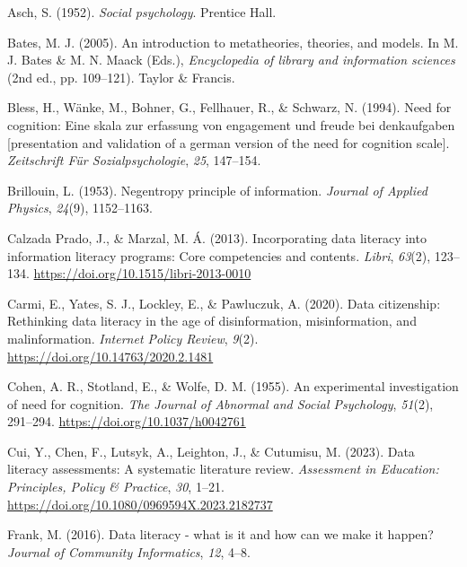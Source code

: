 \documentclass[
  12pt,
  a4paper,
  twoside]{article}
\newlength{\cslhangindent}
\newenvironment{CSLReferences}[2] %
 {\begin{list}{}{%
  \setlength{\itemindent}{0pt}
  \setlength{\leftmargin}{0pt}
  \setlength{\parsep}{0pt}
  \ifodd #1
   \setlength{\leftmargin}{\cslhangindent}
   \setlength{\itemindent}{-1\cslhangindent}
  \fi
  \setlength{\itemsep}{#2\baselineskip}}}
 {\end{list}}
\begin{document}
\label{refs}
\begin{CSLReferences}{1}{0}
Asch, S. (1952). \emph{Social psychology}. Prentice Hall.

Bates, M. J. (2005). An introduction to metatheories, theories, and models. In M. J. Bates \& M. N. Maack (Eds.), \emph{Encyclopedia of library and information sciences} (2nd ed., pp. 109--121). Taylor \& Francis.

Bless, H., Wänke, M., Bohner, G., Fellhauer, R., \& Schwarz, N. (1994). Need for cognition: Eine skala zur erfassung von engagement und freude bei denkaufgaben {[}presentation and validation of a german version of the need for cognition scale{]}. \emph{Zeitschrift Für Sozialpsychologie}, \emph{25}, 147--154.

Brillouin, L. (1953). Negentropy principle of information. \emph{Journal of Applied Physics}, \emph{24}(9), 1152--1163.

Calzada Prado, J., \& Marzal, M. Á. (2013). Incorporating data literacy into information literacy programs: Core competencies and contents. \emph{Libri}, \emph{63}(2), 123--134. \url{https://doi.org/10.1515/libri-2013-0010}

Carmi, E., Yates, S. J., Lockley, E., \& Pawluczuk, A. (2020). Data citizenship: Rethinking data literacy in the age of disinformation, misinformation, and malinformation. \emph{Internet Policy Review}, \emph{9}(2). \url{https://doi.org/10.14763/2020.2.1481}

Cohen, A. R., Stotland, E., \& Wolfe, D. M. (1955). An experimental investigation of need for cognition. \emph{The Journal of Abnormal and Social Psychology}, \emph{51}(2), 291--294. \url{https://doi.org/10.1037/h0042761}

Cui, Y., Chen, F., Lutsyk, A., Leighton, J., \& Cutumisu, M. (2023). Data literacy assessments: A systematic literature review. \emph{Assessment in Education: Principles, Policy \& Practice}, \emph{30}, 1--21. \url{https://doi.org/10.1080/0969594X.2023.2182737}

Frank, M. (2016). Data literacy - what is it and how can we make it happen? \emph{Journal of Community Informatics}, \emph{12}, 4--8.


\end{CSLReferences}
\end{document}
